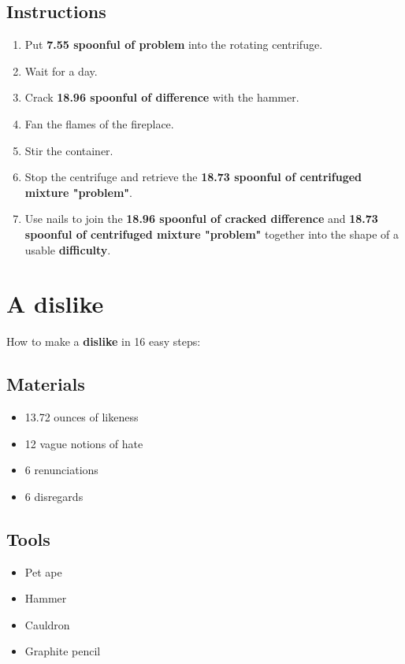 \documentclass{article}
\begin{document}
\subsection{Instructions}\begin{enumerate}
\item 
Put \textbf{7.55 spoonful of problem} into the rotating centrifuge.
\item 
Wait for a day.
\item 
Crack \textbf{18.96 spoonful of difference} with the hammer.
\item 
Fan the flames of the fireplace.
\item 
Stir the container.
\item 
Stop the centrifuge and retrieve the \textbf{18.73 spoonful of centrifuged mixture "problem"}.
\item 
Use nails to join the \textbf{18.96 spoonful of cracked difference} and \textbf{18.73 spoonful of centrifuged mixture "problem"} together into the shape of a usable \textbf{difficulty}.
\end{enumerate}
\newpage
\section{A dislike}How to make a \textbf{dislike} in 16 easy steps:

\subsection{Materials}\begin{itemize}
\item 
13.72 ounces of likeness
\item 
12 vague notions of hate
\item 
6 renunciations
\item 
6 disregards
\end{itemize}
\subsection{Tools}\begin{itemize}
\item 
Pet ape
\item 
Hammer
\item 
Cauldron
\item 
Graphite pencil
\end{itemize}
\end{document}
